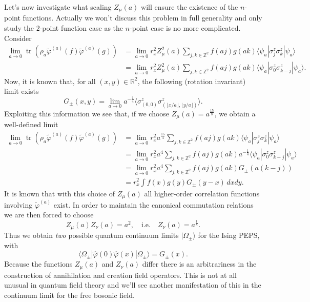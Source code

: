 \documentclass[prl,twocolumn,lengthcheck,superscriptaddress]{revtex4-1}
\newcommand{\tr}{\operatorname{tr}}
\theoremstyle{definition}
\theoremstyle{remark}
\begin{document}
Let's now investigate what scaling $Z_{\mu}(a)$ will ensure the existence of the $n$-point functions. Actually we won't discuss this problem in full generality and only study the $2$-point function case as the $n$-point case is no more complicated. Consider
\begin{equation}
	\begin{split}
	\lim_{a\rightarrow 0} \tr\left(\rho_a \widetilde{\varphi}^{(a)}(f)\widetilde{\varphi}^{(a)}(g)\right) &= \lim_{a\rightarrow 0}r_x^2Z_{\mu}^2(a) \sum_{j,k\in \mathbb{Z}^2} f(aj)g(ak) \langle \psi_a|\sigma^z_j\sigma^z_k|\psi_a\rangle \\
	&= \lim_{a\rightarrow 0}r_x^2Z_{\mu}^2(a) \sum_{j,k\in \mathbb{Z}^2} f(aj)g(ak) \langle\psi_a|\sigma^z_0\sigma^z_{k-j}|\psi_a\rangle.
	\end{split}
\end{equation}
Now, it is known that, for all $(x,y)\in \mathbb{R}^2$, the following (rotation invariant) limit exists
\begin{equation}
	G_{\pm}(x,y) = \lim_{a\rightarrow 0} a^{-\frac{1}{4}} \langle \sigma^z_{(0,0)}\sigma^z_{(\lfloor x/a\rfloor,\lfloor y/a\rfloor)}\rangle.
\end{equation}
Exploiting this information we see that, if we choose $Z_\mu(a) = a^{\frac{15}{8}}$, we obtain a well-defined limit
\begin{equation}
	\begin{split}
	\lim_{a\rightarrow 0} \tr\left(\rho_a \widetilde{\varphi}^{(a)}(f)\widetilde{\varphi}^{(a)}(g)\right) &= \lim_{a\rightarrow 0}r_x^2a^{\frac{15}{4}} \sum_{j,k\in \mathbb{Z}^2} f(aj)g(ak) \langle \psi_a|\sigma^z_j\sigma^z_k|\psi_a\rangle \\
	&= \lim_{a\rightarrow 0}r_x^2a^{4} \sum_{j,k\in \mathbb{Z}^2} f(aj)g(ak) a^{-\frac14}\langle \psi_a|\sigma^z_0\sigma^z_{k-j}|\psi_a\rangle \\
	&= \lim_{a\rightarrow 0}r_x^2a^{4} \sum_{j,k\in \mathbb{Z}^2} f(aj)g(ak) G_{\pm}(a(k-j)) \\
	&= r_x^2 \int f(x)g(y)G_{\pm}(y-x) \, dxdy.
	\end{split}
\end{equation}
It is known \cite{mccoy:1977a} that with this choice of $Z_\mu(a)$ all higher-order correlation functions involving $\widetilde{\varphi}^{(a)}$ exist.
In order to maintain the canonical commutation relations we are then forced to choose  
\begin{equation}
	Z_\mu(a)Z_\nu(a) = a^2, \quad \text{i.e.} \quad Z_{\nu}(a) = a^{\frac18}.
\end{equation}
Thus we obtain \emph{two} possible quantum continuum limits $|\Omega_{\pm}\rangle$ for the Ising PEPS, with
\begin{equation}
	\langle \Omega_{\pm}|\widehat{\varphi}(0)\widehat{\varphi}(x)|\Omega_{\pm}\rangle = G_{\pm}(x).
\end{equation}
Because the functions $Z_{\mu}(a)$ and $Z_{\nu}(a)$ differ there is an arbitrariness in the construction of annihilation and creation field operators. This is not at all unusual in quantum field theory and we'll see another manifestation of this in the continuum limit for the free bosonic field.
\end{document}
